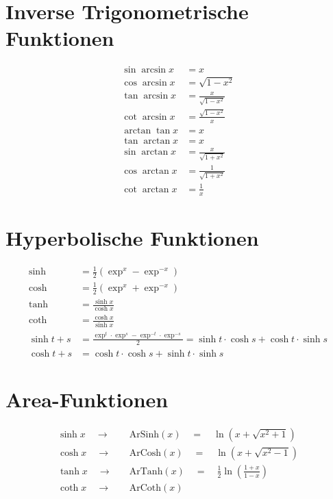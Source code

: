 \section{Inverse Trigonometrische Funktionen}
\begin{align}
  \sin{\arcsin{x}} &= x \\
  \cos{\arcsin{x}} &= \sqrt{1-x^2} \\
  \tan{\arcsin{x}} &= \frac{x}{\sqrt{1-x^2}} \\
  \cot{\arcsin{x}} &= \frac{\sqrt{1-x^2}}{x} \\
  \arctan{\tan{x}} &= x \\
  \tan{\arctan{x}} &= x \\
  \sin{\arctan{x}} &= \frac{x}{\sqrt{1+x^2}} \\
  \cos{\arctan{x}} &= \frac{1}{\sqrt{1+x^2}} \\
  \cot{\arctan{x}} &= \frac{1}{x}
\end{align}

\section{Hyperbolische Funktionen}
\begin{align}
  \sinh &= \frac{1}{2}\left({\exp^x-\exp^{-x}}\right) \\
  \cosh &= \frac{1}{2}\left({\exp^x+\exp^{-x}}\right) \\
  \tanh &= \frac{\sinh{x}}{\cosh{x}} \\
  \coth &= \frac{\cosh{x}}{\sinh{x}} \\
  \sinh{t+s} &= \frac{\exp^t\cdot\exp^s-\exp^{-t}\cdot\exp^{-s}}{2} = \sinh{t}\cdot\cosh{s}+\cosh{t}\cdot\sinh{s} \\
  \cosh{t+s} &= \cosh{t}\cdot\cosh{s}+\sinh{t}\cdot\sinh{s}
\end{align}

\section{Area-Funktionen}
\begin{align}
  \sinh{x} \quad\longrightarrow & \quad\text{ArSinh}(x) \quad=\quad\ln{\left({x+\sqrt{x^2+1}}\right)} \\
  \cosh{x} \quad\longrightarrow & \quad\text{ArCosh}(x) \quad=\quad\ln{\left({x+\sqrt{x^2-1}}\right)} \\
  \tanh{x} \quad\longrightarrow & \quad\text{ArTanh}(x) \quad=\quad\frac{1}{2}\ln{\left({\frac{1+x}{1-x}}\right)} \\
  \coth{x} \quad\longrightarrow & \quad\text{ArCoth}(x)
\end{align}


%
%
